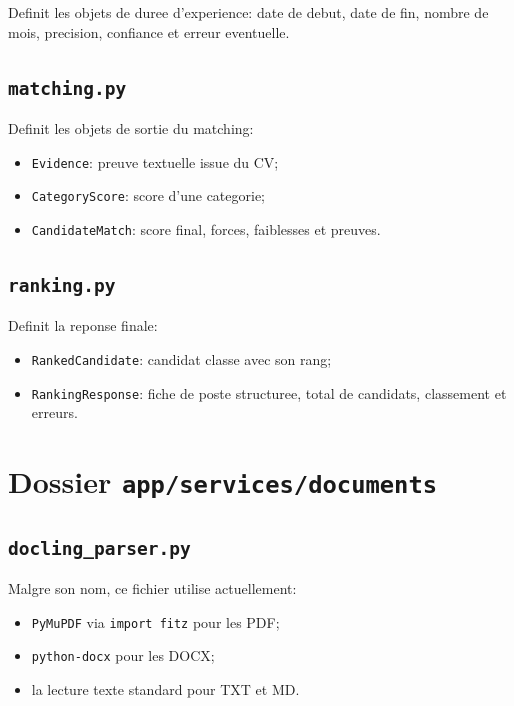 \documentclass[12pt,a4paper]{article}
\begin{document}
Definit les objets de duree d'experience: date de debut, date de fin, nombre de mois, precision, confiance et erreur eventuelle.

\subsection{\texttt{matching.py}}

Definit les objets de sortie du matching:

\begin{itemize}
  \item \texttt{Evidence}: preuve textuelle issue du CV;
  \item \texttt{CategoryScore}: score d'une categorie;
  \item \texttt{CandidateMatch}: score final, forces, faiblesses et preuves.
\end{itemize}

\subsection{\texttt{ranking.py}}

Definit la reponse finale:

\begin{itemize}
  \item \texttt{RankedCandidate}: candidat classe avec son rang;
  \item \texttt{RankingResponse}: fiche de poste structuree, total de candidats, classement et erreurs.
\end{itemize}

\section{Dossier \texttt{app/services/documents}}

\subsection{\texttt{docling\_parser.py}}

Malgre son nom, ce fichier utilise actuellement:

\begin{itemize}
  \item \texttt{PyMuPDF} via \texttt{import fitz} pour les PDF;
  \item \texttt{python-docx} pour les DOCX;
  \item la lecture texte standard pour TXT et MD.
\end{itemize}
\end{document}
